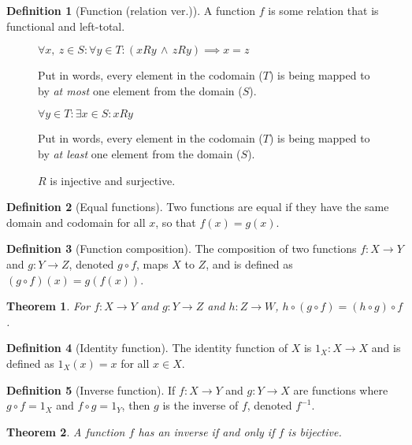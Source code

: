 \documentclass{article}
\theoremstyle{plain}
\newtheorem{theorem}{Theorem}[section]
\numberwithin{theorem}{subsection}
\theoremstyle{definition}
\newtheorem{definition}{Definition}[section]
\numberwithin{definition}{subsection}
\theoremstyle{remark}
\numberwithin{note}{section}
\begin{document}
\begin{definition}[Function (relation ver.)]
    A function $f$ is some relation that is functional and left-total.
\end{definition}
%
\begin{figure}[H]
\begin{mdframed}[style=exampledefault,frametitle={Function properties}]
\begin{description}[style=sameline]
	\item[Injective (one-to-one):]
		$\forall x,\: z \in S : \forall y \in T
		: (xRy \,\land\, zRy) \implies x = z$

		Put in words, every element in the codomain ($T$)
		is being mapped to by \textit{at most} one element from the domain ($S$).
	\item[Surjective (onto):]
		$\forall y \in T : \exists x \in S : xRy$

		Put in words, every element in the codomain ($T$)
		is being mapped to by \textit{at least} one element from the domain ($S$).
	\item[Bijective:]
		$R$ is injective and surjective.
\end{description}
\end{mdframed}
\end{figure}
%
\begin{definition}[Equal functions]
    Two functions are equal if they have the same domain and codomain
    for all $x$, so that $f(x) = g(x)$.
\end{definition}
%
\begin{definition}[Function composition]
    The composition of two functions $f:X \to Y$ and $g:Y \to Z$,
    denoted $g \circ f$, maps $X$ to $Z$, and is defined as
    $(g \circ f)(x) = g(f(x))$.
\end{definition}
%
\begin{theorem}
    For $f:X \to Y$ and $g:Y \to Z$ and  $h:Z \to W$,
    $h \circ (g \circ f) = (h \circ g) \circ f$.
\end{theorem}
%
\begin{definition}[Identity function]
    The identity function of $X$ is $1_X:X \to X$ and is defined as
    $1_X (x)=x$ for all $x \in X$.
\end{definition}
%
\begin{definition}[Inverse function]
    If $f:X \to Y$ and $g:Y \to X$ are functions where
    $g \circ f = 1_X$ and $f \circ g = 1_Y$,
    then $g$ is the inverse of $f$, denoted $f^{-1}$.
\end{definition}
%
\begin{theorem}
    A function $f$ has an inverse if and only if $f$ is bijective.
\end{theorem}
%
\end{document}
